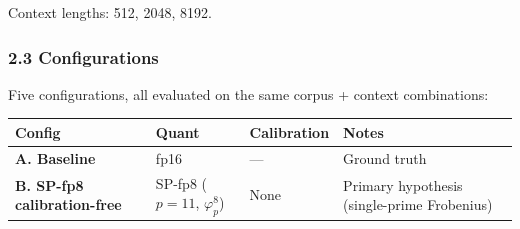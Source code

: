 \documentclass[
  11pt,
]{article}
\begin{document}
Context lengths: 512, 2048, 8192.

\hypertarget{configurations}{%
\subsubsection{2.3 Configurations}\label{configurations}}

Five configurations, all evaluated on the same corpus + context
combinations:

\begin{longtable}[]{@{}llll@{}}
\toprule
\begin{minipage}[b]{0.22\columnwidth}\raggedright
Config\strut
\end{minipage} & \begin{minipage}[b]{0.22\columnwidth}\raggedright
Quant\strut
\end{minipage} & \begin{minipage}[b]{0.22\columnwidth}\raggedright
Calibration\strut
\end{minipage} & \begin{minipage}[b]{0.22\columnwidth}\raggedright
Notes\strut
\end{minipage}\tabularnewline
\midrule
\endhead
\begin{minipage}[t]{0.22\columnwidth}\raggedright
\textbf{A. Baseline}\strut
\end{minipage} & \begin{minipage}[t]{0.22\columnwidth}\raggedright
fp16\strut
\end{minipage} & \begin{minipage}[t]{0.22\columnwidth}\raggedright
---\strut
\end{minipage} & \begin{minipage}[t]{0.22\columnwidth}\raggedright
Ground truth\strut
\end{minipage}\tabularnewline
\begin{minipage}[t]{0.22\columnwidth}\raggedright
\textbf{B. SP-fp8 calibration-free}\strut
\end{minipage} & \begin{minipage}[t]{0.22\columnwidth}\raggedright
SP-fp8 (\(p = 11\), \(\varphi_p^8\))\strut
\end{minipage} & \begin{minipage}[t]{0.22\columnwidth}\raggedright
None\strut
\end{minipage} & \begin{minipage}[t]{0.22\columnwidth}\raggedright
Primary hypothesis (single-prime Frobenius)\strut
\end{minipage}\tabularnewline

\end{longtable}
\end{document}
